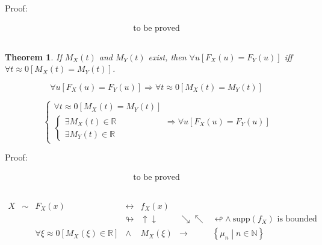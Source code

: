 \documentclass[
]{book}
\newtheorem{theorem}{Theorem}[chapter]
\theoremstyle{definition}
\theoremstyle{definition}
\theoremstyle{definition}
\theoremstyle{definition}
\theoremstyle{remark}
\begin{document}
Proof:

\[
\begin{aligned}
\text{to be proved}
\end{aligned}
\]

\[
\tag*{$\Box$}
\]

\begin{theorem}
\protect\hypertarget{thm:unnamed-chunk-29}{}\label{thm:unnamed-chunk-29}If \(M_{{\scriptscriptstyle X}}\left(t\right)\) and \(M_{{\scriptscriptstyle Y}}\left(t\right)\) exist, then \(\forall u\left[F_{{\scriptscriptstyle X}}\left(u\right)=F_{{\scriptscriptstyle Y}}\left(u\right)\right]\) iff \(\forall t\approx0\left[M_{{\scriptscriptstyle X}}\left(t\right)=M_{{\scriptscriptstyle Y}}\left(t\right)\right]\).
\end{theorem}

\[
\forall u\left[F_{{\scriptscriptstyle X}}\left(u\right)=F_{{\scriptscriptstyle Y}}\left(u\right)\right]\Rightarrow\forall t\approx0\left[M_{{\scriptscriptstyle X}}\left(t\right)=M_{{\scriptscriptstyle Y}}\left(t\right)\right]
\]

\[
\begin{cases}
\forall t\approx0\left[M_{{\scriptscriptstyle X}}\left(t\right)=M_{{\scriptscriptstyle Y}}\left(t\right)\right]\\
\begin{cases}
\exists M_{{\scriptscriptstyle X}}\left(t\right)\in\mathbb{R}\\
\exists M_{{\scriptscriptstyle Y}}\left(t\right)\in\mathbb{R}
\end{cases}
\end{cases}\Rightarrow\forall u\left[F_{{\scriptscriptstyle X}}\left(u\right)=F_{{\scriptscriptstyle Y}}\left(u\right)\right]
\]

Proof:

\[
\begin{aligned}
\text{to be proved}
\end{aligned}
\]

\[
\tag*{$\Box$}
\]

\[
\begin{array}{ccccccc}
X & \sim & F_{{\scriptscriptstyle X}}\left(x\right) & \leftrightarrow & f_{{\scriptscriptstyle X}}\left(x\right)\\
 &  &  & \looparrowright & \uparrow\downarrow & \searrow\nwarrow & \looparrowleft\wedge\ \mathrm{supp}\left(f_{{\scriptscriptstyle X}}\right)\text{ is bounded}\\
 &  & \forall\xi\approx0\left[M_{{\scriptscriptstyle X}}\left(\xi\right)\in\mathbb{R}\right] & \wedge & M_{{\scriptscriptstyle X}}\left(\xi\right) & \rightarrow & \left\{ \mu_{{\scriptscriptstyle n}}\middle|n\in\mathbb{N}\right\} 
\end{array}
\]
\end{document}
